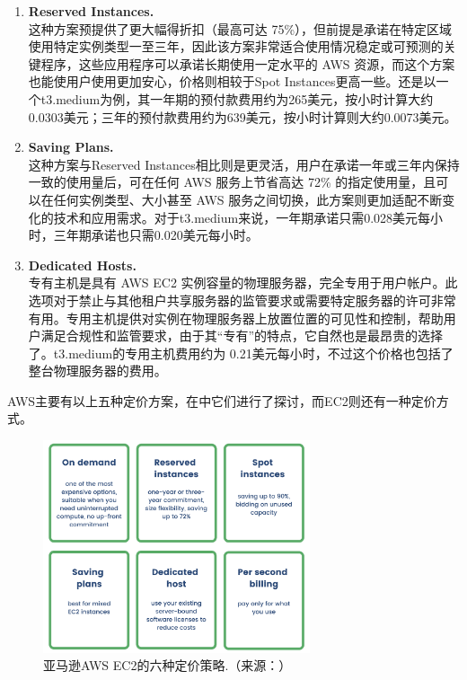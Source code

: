 \documentclass[12pt]{ctexart}
\begin{document}
\begin{itemize}
\begin{enumerate}
        \item \textbf{Reserved Instances.} \\
        这种方案预提供了更大幅得折扣（最高可达 75\%），但前提是承诺在特定区域使用特定实例类型一至三年，因此该方案非常适合使用情况稳定或可预测的关键程序，这些应用程序可以承诺长期使用一定水平的 AWS 资源，而这个方案也能使用户使用更加安心，价格则相较于Spot Instances更高一些。还是以一个t3.medium为例，其一年期的预付款费用约为265美元，按小时计算大约0.0303美元；三年的预付款费用约为639美元，按小时计算则大约0.0073美元。
        
        \item \textbf{Saving Plans.} \\
        这种方案与Reserved Instances相比则是更灵活，用户在承诺一年或三年内保持一致的使用量后，可在任何 AWS 服务上节省高达 72\% 的指定使用量，且可以在任何实例类型、大小甚至 AWS 服务之间切换，此方案则更加适配不断变化的技术和应用需求。对于t3.medium来说，一年期承诺只需0.028美元每小时，三年期承诺也只需0.020美元每小时。
        
        \item \textbf{Dedicated Hosts.} \\
        专有主机是具有 AWS EC2 实例容量的物理服务器，完全专用于用户帐户。此选项对于禁止与其他租户共享服务器的监管要求或需要特定服务器的许可非常有用。专用主机提供对实例在物理服务器上放置位置的可见性和控制，帮助用户满足合规性和监管要求，由于其“专有”的特点，它自然也是最昂贵的选择了。t3.medium的专用主机费用约为 0.21美元每小时，不过这个价格也包括了整台物理服务器的费用。
        
    \end{enumerate}  
    
\end{itemize}
 AWS主要有以上五种定价方案，在\cite{36}中它们进行了探讨，而EC2则还有一种定价方式。
 
    \begin{figure}[htbp!]
        \centering
        \includegraphics[width=0.7\textwidth]{Images/1618012212696.png}
        \caption{亚马逊AWS EC2的六种定价策略.（来源：\cite{35}）}
        \label{fiv}
     \end{figure}
     
\end{document}
